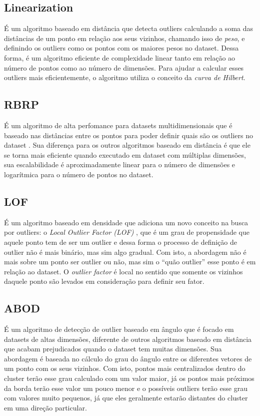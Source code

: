 \subsection{Linearization}

É um algoritmo baseado em distância \cite{10.1007/3-540-45681-3_2} que detecta outliers calculando a soma das distâncias de um ponto em relação aos seus vizinhos, chamando isso de \textit{peso}, e definindo os outliers como os pontos com os maiores pesos no dataset. Dessa forma, é um algoritmo eficiente de complexidade linear tanto em relação ao número de pontos como ao número de dimensões. Para ajudar a calcular esses outliers mais eficientemente, o algoritmo utiliza o conceito da \textit{curva de Hilbert}.

\subsection{RBRP}

É um algoritmo de alta perfomance para datasets multidimensionais que é baseado nas distâncias entre os pontos para poder definir quais são os outliers no dataset \cite{Ghoting2006}. Sua diferença para os outros algoritmos baseado em distância é que ele se torna mais eficiente quando executado em dataset com múltiplas dimensões, sua escalabilidade é aproximadamente linear para o número de dimensões e logarítmica para o número de pontos no dataset.

\subsection{LOF}

É um algoritmo baseado em densidade que adiciona um novo conceito na busca por outliers: o \textit{Local Outlier Factor (LOF)} \cite{Breunig:2000:LID:335191.335388}, que é um grau de propensidade que aquele ponto tem de ser um outlier e dessa forma o processo de definição de outlier não é mais binário, mas sim algo gradual. Com isto, a abordagem não é mais sobre um ponto ser outlier ou não, mas sim o ``quão outlier'' esse ponto é em relação ao dataset. O \textit{outlier factor} é local no sentido que somente os vizinhos daquele ponto são levados em consideração para definir seu fator.

\subsection{ABOD}

É um algoritmo de detecção de outlier baseado em ângulo \cite{Kriegel:2008:AOD:1401890.1401946} que é focado em datasets de altas dimensões, diferente de outros algoritmos baseado em distância que acabam prejudicados quando o dataset tem muitas dimensões. Sua abordagem é baseada no cálculo do grau do ângulo entre os diferentes vetores de um ponto com os seus vizinhos. Com isto, pontos mais centralizados dentro do cluster terão esse grau calculado com um valor maior, já os pontos mais próximos da borda terão esse valor um pouco menor e o possíveis outliers terão esse grau com valores muito pequenos, já que eles geralmente estarão distantes do cluster em uma direção particular. 

